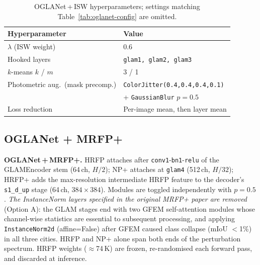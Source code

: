 \begin{table}[h]
\centering
\caption{OGLANet\,+\,ISW hyperparameters; settings matching
Table~\ref{tab:oglanet-config} are omitted.}
\label{tab:oglanet-isw}
\small
\begin{tabular}{@{}ll@{}}
\toprule
\textbf{Hyperparameter} & \textbf{Value} \\
\midrule
$\lambda$ (ISW weight)         & 0.6 \\
Hooked layers                  & \texttt{glam1, glam2, glam3} \\
$k$-means $k$ / $m$            & 3 / 1 \\
Photometric aug.\ (mask precomp.)\!\!
  & \texttt{ColorJitter(0.4,0.4,0.4,0.1)} \\
  & + \texttt{GaussianBlur} $p{=}0.5$ \\
Loss reduction                 & Per-image mean, then layer mean \\
\bottomrule
\end{tabular}
\end{table}

\subsection{OGLANet + MRFP+}

\textbf{OGLANet\,+\,MRFP+.}
HRFP attaches after \texttt{conv1}-\texttt{bn1}-\texttt{relu} of the
GLAMEncoder stem (64\,ch, $H/2$); NP+ attaches at \texttt{glam4}
(512\,ch, $H/32$); HRFP+ adds the max-resolution intermediate HRFP
feature to the decoder's \texttt{s1\_d\_up} stage (64\,ch,
$384{\times}384$).  Modules are toggled independently with $p{=}0.5$.
\emph{The InstanceNorm layers specified in the original MRFP+ paper
are removed} (Option A): the GLAM stages end with two GFEM
self-attention modules whose channel-wise statistics are essential
to subsequent processing, and applying \texttt{InstanceNorm2d}
(affine=False) after GFEM caused class collapse (mIoU $<$1\%) in all
three cities.  HRFP and NP+ alone span both ends of the perturbation
spectrum.  HRFP weights ($\approx$74\,K) are frozen, re-randomised
each forward pass, and discarded at inference.

